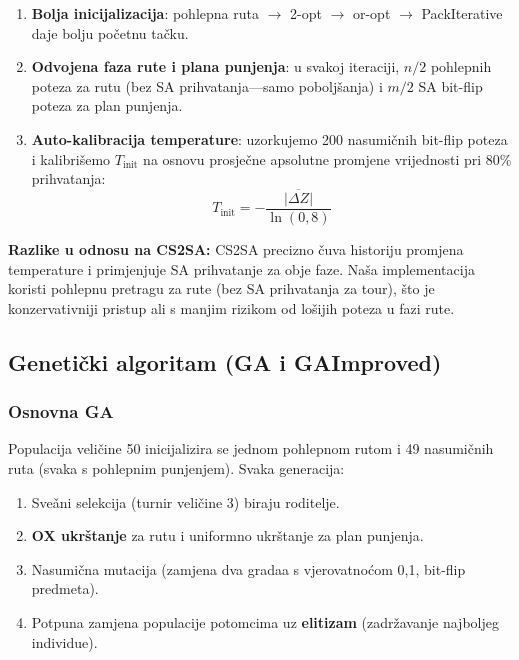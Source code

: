 \documentclass[12pt,a4paper]{article}
\begin{document}
\begin{enumerate}
    \item \textbf{Bolja inicijalizacija}: pohlepna ruta $\to$ 2-opt $\to$ or-opt $\to$ PackIterative daje bolju po\v{c}etnu ta\v{c}ku.
    \item \textbf{Odvojena faza rute i plana punjenja}: u svakoj iteraciji, $n/2$ pohlepnih poteza za rutu (bez SA prihvatanja---samo pobolj\v{s}anja) i $m/2$ SA bit-flip poteza za plan punjenja.
    \item \textbf{Auto-kalibracija temperature}: uzorkujemo 200 nasumi\v{c}nih bit-flip poteza i kalibrišemo $T_{\text{init}}$ na osnovu prosje\v{c}ne apsolutne promjene vrijednosti pri 80\% prihvatanja:
    \begin{equation}
        T_{\text{init}} = -\frac{\overline{|\Delta Z|}}{\ln(0{,}8)}
    \end{equation}
\end{enumerate}

\textbf{Razlike u odnosu na CS2SA:} CS2SA precizno \v{c}uva historiju promjena temperature i primjenjuje SA prihvatanje za obje faze. Na\v{s}a implementacija koristi pohlepnu pretragu za rute (bez SA prihvatanja za tour), \v{s}to je konzervativniji pristup ali s manjim rizikom od lo\v{s}ijih poteza u fazi rute.

\subsection{Genetički algoritam (GA i GAImproved)}

\subsubsection{Osnovna GA}

Populacija veli\v{c}ine 50 inicijalizira se jednom pohlepnom rutom i 49 nasumi\v{c}nih ruta (svaka s pohlepnim punjenjem). Svaka generacija:
\begin{enumerate}
    \item Sve\v{a}ni selekcija (turnir veli\v{c}ine 3) biraju roditelje.
    \item \textbf{OX ukrštanje} za rutu i uniformno ukrštanje za plan punjenja.
    \item Nasumi\v{c}na mutacija (zamjena dva gradaa s vjerovatno\'{c}om 0{,}1, bit-flip predmeta).
    \item Potpuna zamjena populacije potomcima uz \textbf{elitizam} (zadržavanje najboljeg individue).
\end{enumerate}
\end{document}
